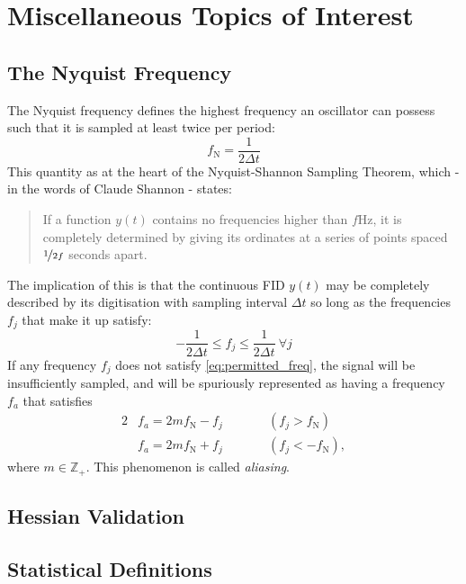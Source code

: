 \section{Miscellaneous Topics of Interest}
\label{sec:misc}

\subsection{The Nyquist Frequency}
\label{sec:nyquist}
The Nyquist frequency defines the highest frequency an oscillator can possess
such that it is sampled at least twice per period:
\begin{equation}
  f_{\mathrm{N}} = \frac{1}{2\Delta t}
\end{equation}
This quantity as at the heart of the Nyquist-Shannon Sampling Theorem, which -
in the words of Claude Shannon\cite{Shannon1949} - states:
\begin{quote}
  If a function $y(t)$ contains no frequencies
  higher than $f \si{\hertz}$, it is completely determined by giving
  its ordinates at a series of points spaced $\nicefrac{1}{2f}$ seconds
  apart.
\end{quote}
The implication of this is that the continuous FID $y(t)$ may be completely
described by its digitisation with sampling interval $\Delta t$ so long as the
frequencies $f_j$ that make it up satisfy:
\begin{equation}
  \label{permitted_freq}
  -\frac{1}{2\Delta t} \leq f_j \leq \frac{1}{2\Delta t}\ \forall j
\end{equation}
If any frequency $f_j$ does not satisfy \eqref{eq:permitted_freq}, the signal
will be insufficiently sampled, and will be spuriously represented as having a
frequency $f_a$ that satisfies
\begin{alignat}{2}
  &f_a = 2mf_{\mathrm{N}} - f_j \quad \quad &&(f_j > f_{\mathrm{N}})\\
  &f_a = 2mf_{\mathrm{N}} + f_j \quad \quad &&(f_j < -f_{\mathrm{N}}),
\end{alignat}
where $m \in \mathbb{Z}_+$. This phenomenon is called \textit{aliasing}.

\subsection{Hessian Validation}

\subsection{Statistical Definitions}
